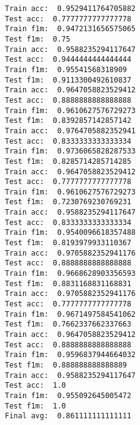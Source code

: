 \documentclass[11pt]{article}
\begin{document}
    \begin{Verbatim}[commandchars=\\\{\}]
Train acc:  0.9529411764705882
Test acc:  0.7777777777777778
Train f1m:  0.9472131656575065
Test f1m:  0.75
Train acc:  0.9588235294117647
Test acc:  0.9444444444444444
Train f1m:  0.95541568318909
Test f1m:  0.9113300492610837
Train acc:  0.9647058823529412
Test acc:  0.8888888888888888
Train f1m:  0.9610627576729273
Test f1m:  0.8392857142857142
Train acc:  0.9764705882352941
Test acc:  0.8333333333333334
Train f1m:  0.9736065828287533
Test f1m:  0.8285714285714285
Train acc:  0.9647058823529412
Test acc:  0.7777777777777778
Train f1m:  0.9610627576729273
Test f1m:  0.7230769230769231
Train acc:  0.9588235294117647
Test acc:  0.8333333333333334
Train f1m:  0.9540096618357488
Test f1m:  0.8193979933110367
Train acc:  0.9705882352941176
Test acc:  0.8888888888888888
Train f1m:  0.9668628903356593
Test f1m:  0.8831168831168831
Train acc:  0.9705882352941176
Test acc:  0.7777777777777778
Train f1m:  0.9671497584541062
Test f1m:  0.7662337662337663
Train acc:  0.9647058823529412
Test acc:  0.8888888888888888
Train f1m:  0.9596837944664032
Test f1m:  0.888888888888889
Train acc:  0.9588235294117647
Test acc:  1.0
Train f1m:  0.955092645005472
Test f1m:  1.0
Final avg:  0.861111111111111

    \end{Verbatim}


    
    
    
    
\end{document}
